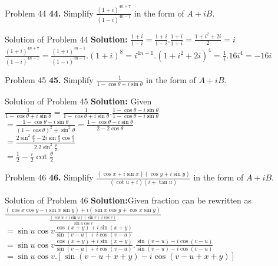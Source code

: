 \documentclass[aspectratio=169,8pt]{beamer}
\begin{document}
\begin{frame}{Problem 44}
  \textbf{44.} Simplify $\frac{(1 + i)^{4n + 7}}{(1 - i)^{4n - 1}}$ in the form of $A + iB.$
\end{frame}
\begin{frame}{Solution of Problem 44}
  \textbf{Solution:} $\frac{1 + i}{1 - i} = \frac{1 + i}{1 - i}.\frac{1 + i}{1 + i} = \frac{1 + i^2 + 2i}{2} = i$\\
  \vspace*{0.2cm}
  $\frac{(1 + i)^{4n + 7}}{(1 - i)^{4n - 1}} = \frac{(1 + i)^{4n - 1}}{(1 - i)^{4n - 1}}. (1 + i)^8 = i^{4n - 1}.(1 + i^2 + 2i)^4 = \frac{1}{i}.16i^4 = -16i$
\end{frame}
\begin{frame}{Problem 45}
  \textbf{45.} Simplify $\frac{1}{1 - \cos\theta + i\sin\theta}$ in the form of $A + iB.$
\end{frame}
\begin{frame}{Solution of Problem 45}
  \textbf{Solution:} Given $\frac{1}{1 - \cos\theta + i\sin\theta} = \frac{1}{1 - \cos\theta + i\sin\theta}.\frac{1 - \cos\theta -i\sin\theta}{1 - \cos\theta - i\sin\theta}$\\
  \vspace*{0.2cm}
  $= \frac{1 - \cos\theta - i\sin\theta}{(1 - \cos\theta)^2 + \sin^2\theta} = \frac{1 - \cos\theta - i\sin\theta}{2 - 2\cos\theta}$\\
  \vspace*{0.2cm}
  $= \frac{2\sin^2\frac{\theta}{2} - 2i\sin\frac{\theta}{2}\cos\frac{\theta}{2}}{2.2\sin^2\frac{\theta}{2}}$\\
  \vspace*{0.2cm}
  $= \frac{1}{2} - \frac{i}{2}\cot\frac{\theta}{2}$
\end{frame}
\begin{frame}{Problem 46}
  \textbf{46.} Simplify $\frac{(\cos x + i\sin x)(\cos y + i\sin y)}{(\cot u + i)(i + \tan u)}$ in the form of $A + iB.$
\end{frame}
\begin{frame}{Solution of Problem 46}
  \textbf{Solution:}Given fraction can be rewritten as $\frac{(\cos x\cos y - i\sin x\sin y) + i(\sin x\cos y + \cos x\sin y)}{\frac{(\cos u + i\sin u)(\sin v + i\cos v)}{\sin u\cos v}}$\\
  \vspace*{0.2cm}
  $= \sin u\cos v\frac{\cos(x + y) + i\sin(x + y)}{\sin(v - u) + i\cos(v- u)}$\\
  \vspace*{0.2cm}
  $= \sin u \cos v\frac{\cos(x + y) + i\sin(x + y)}{\sin(v - u) + i\cos(v- u)}.\frac{\sin(v - u) - i\cos(v - u)}{\sin(v - u) - i\cos(v - u)}$\\
  \vspace*{0.2cm}
  $= \sin u\cos v.[\sin(v - u + x + y) - i\cos(v - u + x + y)]$
\end{frame}
\end{document}
